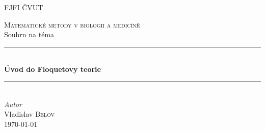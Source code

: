 \pagestyle{empty}

\begin{titlepage} %
	\newcommand{\HRule}{\rule{\linewidth}{0.5mm}} %
	\center %
	
	\textsc{\LARGE FJFI ČVUT}\\[1.5cm] %
	\vfill
	
	\textsc{\Large Matematické metody v biologii a medicíně}\\[0.5cm] %
	{\large Souhrn na téma}\\[0.5cm] %
	\HRule\\[0.4cm]
	{\huge\bfseries Úvod do Floquetovy teorie}\\[0.4cm] %
	\HRule\\[1.5cm]
	{\large\textit{Autor}}\\
	Vladislav \textsc{Belov}\\
	\vfill\vfill\vfill\vfill\vfill\vfill\vfill %
	{\large\today} %
	
	\vfill %
	
\end{titlepage}

